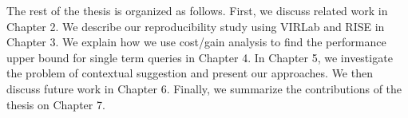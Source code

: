 The rest of the thesis is organized as follows. First, we discuss related 
work in Chapter 2. We describe our reproducibility study using VIRLab and 
RISE in Chapter 3. We explain how we use cost/gain analysis to find the 
performance upper bound for single term queries in Chapter 4. 
In Chapter 5, we investigate the problem of contextual suggestion and 
present our approaches. We then discuss future work in Chapter 6. 
Finally, we summarize the contributions of the thesis on Chapter 7.
